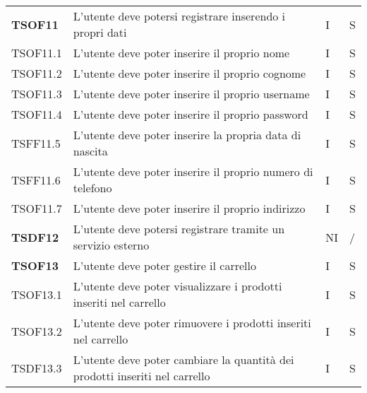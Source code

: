 \begin{center}
\begin{longtable}[!h]{p{60px} p{240px} p{35px} p{35px}}
        \textbf{TSOF11} & L'utente deve potersi registrare inserendo i propri dati                                            & I              & S              \\
        TSOF11.1        & L'utente deve poter inserire il proprio nome                                                        & I              & S              \\
        TSOF11.2        & L'utente deve poter inserire il proprio cognome                                                     & I              & S              \\
        TSOF11.3        & L'utente deve poter inserire il proprio username                                                    & I              & S              \\
        TSOF11.4        & L'utente deve poter inserire il proprio password                                                    & I              & S              \\
        TSFF11.5        & L'utente deve poter inserire la propria data di nascita                                             & I              & S              \\
        TSFF11.6        & L'utente deve poter inserire il proprio numero di telefono                                          & I              & S              \\
        TSOF11.7        & L'utente deve poter inserire il proprio indirizzo                                                   & I              & S              \\
        \textbf{TSDF12} & L'utente deve potersi registrare tramite un servizio esterno                                        & NI             & /              \\
        \textbf{TSOF13} & L'utente deve poter gestire il carrello                                                             & I              & S              \\
        TSOF13.1        & L'utente deve poter visualizzare i prodotti inseriti nel carrello                                   & I              & S              \\
        TSOF13.2        & L'utente deve poter rimuovere i prodotti inseriti nel carrello                                      & I              & S              \\
        TSDF13.3        & L'utente deve poter cambiare la quantità dei prodotti inseriti nel carrello                         & I              & S              \\

\end{longtable}
\end{center}
